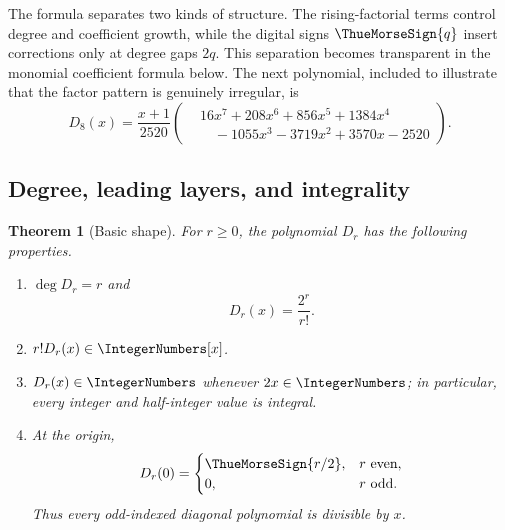 \documentclass[11pt,oneside]{article}
\numberwithin{equation}{section}
\newtheorem{theorem}{Theorem}[section]
\theoremstyle{definition}
\theoremstyle{remark}
\begin{document}
The formula separates two kinds of structure.  The rising-factorial terms
control degree and coefficient growth, while the digital signs \(\ThueMorseSign{q}\)
insert corrections only at degree gaps \(2q\).  This separation becomes
transparent in the monomial coefficient formula below.
The next polynomial, included to illustrate that the
factor pattern is genuinely irregular, is
\begin{equation}
 D_8(x)=\frac{x+1}{2520}
 \left(
 \begin{aligned}
  &16x^7+208x^6+856x^5+1384x^4\\[-0.2em]
  &\quad{}-1055x^3-3719x^2+3570x-2520
 \end{aligned}
 \right).
 \label{p3:b:eq:D8}
\end{equation}
\subsection{Degree, leading layers, and integrality}

\begin{theorem}[Basic shape]
For \(r\ge0\), the polynomial \(D_r\) has the following properties.
\begin{enumerate}
\item \(\deg D_r=r\) and
\begin{equation}
 [x^r]D_r(x)=\frac{2^r}{r!}.
 \label{p3:a:eq:leading-coefficient}
\end{equation}
\item \(r!D_r(x)\in\IntegerNumbers[x]\).
\item \(D_r(x)\in\IntegerNumbers\) whenever \(2x\in\IntegerNumbers\); in particular, every
integer and half-integer value is integral.
\item At the origin,
\begin{equation}
 D_r(0)=
 \begin{cases}
 \ThueMorseSign{r/2},&r\text{ even},\\
 0,&r\text{ odd}.
 \end{cases}
 \label{p3:a:eq:origin-values}
\end{equation}
Thus every odd-indexed diagonal polynomial is divisible by \(x\).
\end{enumerate}
\end{theorem}
\end{document}
